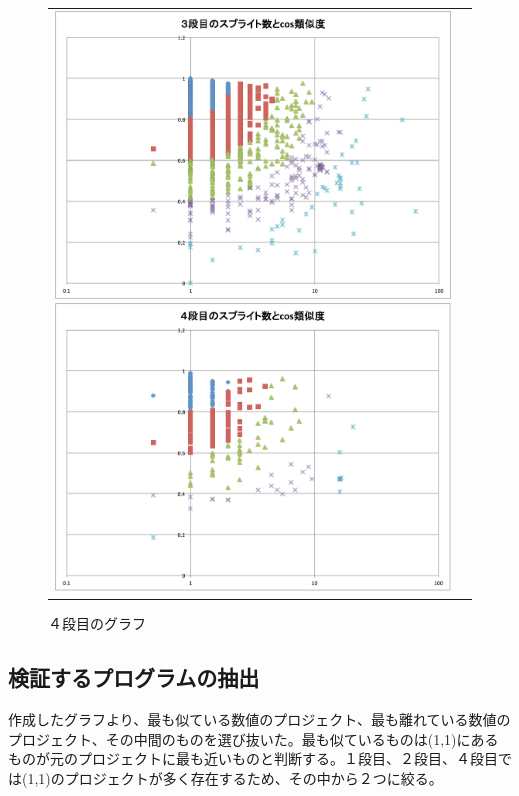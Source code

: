 \documentclass[a4paper,10pt,onecolumn,oneside,openany]{jsbook}
\begin{document}
\begin{figure}[h]
\begin{tabular}{cc}
\begin{minipage}[t]{0.45\hsize}
	 \centering
	 \includegraphics[keepaspectratio, scale = 0.25]{graph_third_splite.pdf}
	 \caption{３段目のグラフ}
	 \label{third_splite}
	\end{minipage}
        \begin{minipage}[t]{0.45\hsize}
	 \centering
	 \includegraphics[keepaspectratio, scale = 0.25]{graph_fourth_splite.pdf}
	 \caption{４段目のグラフ}
	 \label{fourth_splite}
	\end{minipage}
 \end{tabular}
 \end{figure}
 
\subsection{検証するプログラムの抽出}
作成したグラフより、最も似ている数値のプロジェクト、最も離れている数値のプロジェクト、その中間のものを選び抜いた。最も似ているものは(1,1)にあるものが元のプロジェクトに最も近いものと判断する。１段目、２段目、４段目では(1,1)のプロジェクトが多く存在するため、その中から２つに絞る。
\end{document}
